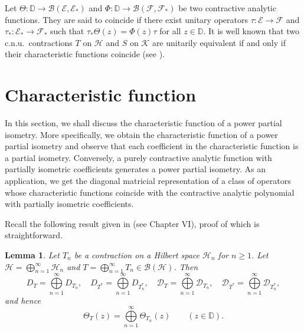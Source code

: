 \documentclass[12pt]{amsart}
\newcommand{\clb}{\mathcal{B}}
\newcommand{\cld}{\mathcal{D}}
\newcommand{\clh}{\mathcal{H}}
\newcommand{\clk}{\mathcal{K}}
\newcommand{\D}{\mathbb{D}}
\newcommand{\E}{\mathcal{E}}
\newcommand{\F}{\mathcal{F}}
\theoremstyle{definition}
\theoremstyle{plain}
\newtheorem{lem}[thm]{Lemma}
\theoremstyle{definition}
\numberwithin{equation}{section}
\begin{document}
Let $\Theta: \D \rightarrow \clb(\E,\E_*)$ and $\Phi : \D \rightarrow \clb(\F,\F_*)$ be two contractive analytic functions. They are said to coincide if there exist unitary operators $\tau: \E \rightarrow \F$ and $\tau_*: \E_* \rightarrow \F_*$ such that $\tau_*\Theta( z)=\Phi( z)\tau$ for all $z \in \D$. It is well known that two c.n.u.\ contractions $T$ on $\clh$ and $S$ on $\clk$ are unitarily equivalent if and only if their characteristic functions coincide (see \cite{sznagy}).





\section{Characteristic function}{\label{sec3}}


In this section, we shall discuss the characteristic function of a power partial isometry. More specifically, we obtain the characteristic function of a power partial isometry and observe that each coefficient in the characteristic function is a partial isometry. Conversely, a purely contractive analytic function with partially isometric coefficients generates a power partial isometry. As an application, we get the diagonal matricial representation of a class of operators whose characteristic functions coincide with the contractive analytic polynomial with partially isometric coefficients. 




Recall the following result given in \cite{sznagy} (see Chapter VI), proof of which is straightforward.

\begin{lem}\label{char-fac-lem1}
Let $T_n$ be a contraction on a Hilbert space $\clh_n$ for $n \geq1$.
Let $\clh=\bigoplus\limits_{n=1}^\infty \clh_n$ and $T =\bigoplus \limits_{n=1}^\infty T_n \in \clb(\clh)$. Then
\[
D_T=\bigoplus\limits_{n=1}^\infty D_{T_n},\quad D_{T^*}=\bigoplus\limits_{n=1}^\infty D_{T_n^*},\quad \cld_T=\bigoplus\limits_{n=1}^\infty \cld_{T_n},\quad\cld_{T^*}=\bigoplus\limits_{n=1}^\infty \cld_{T_n^*},
\]
and hence
\[
\Theta_{T}(z)=\bigoplus\limits_{n=1}^\infty \Theta_{T_n}(z) \quad\quad (z \in \D).
\]
\end{lem}
\end{document}
